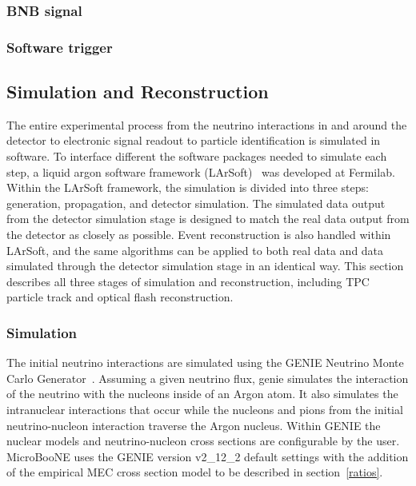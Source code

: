   \subsubsection{BNB signal}
  \subsubsection{Software trigger}

\subsection{Simulation and Reconstruction}\label{reco}
  The entire experimental process from the neutrino interactions in and around
  the detector to electronic signal readout to particle identification is
  simulated in software. To interface different the software packages needed to
  simulate each step, a liquid argon software framework (LArSoft)~\cite{larsoft}
  was developed at Fermilab. Within the LArSoft framework, the simulation is
  divided into three steps: generation, propagation, and detector simulation.
  The simulated data output from the detector simulation stage is designed to
  match the real data output from the detector as closely as possible. Event
  reconstruction is also handled within LArSoft, and the same algorithms can be
  applied to both real data and data simulated through the detector simulation
  stage in an identical way. This section describes all three stages of
  simulation and reconstruction, including TPC particle track and optical flash
  reconstruction.
  \subsubsection{Simulation}
    The initial neutrino interactions are simulated using the GENIE Neutrino
    Monte Carlo Generator~\cite{Andreopoulos:2009rq,Andreopoulos:2015wxa}.
    Assuming a given neutrino flux, genie simulates the interaction of the
    neutrino with the nucleons inside of an Argon atom. It also simulates the
    intranuclear interactions that occur while the nucleons and pions from the
    initial neutrino-nucleon interaction traverse the Argon nucleus.  Within
    GENIE the nuclear models and neutrino-nucleon cross sections are
    configurable by the user.  MicroBooNE uses the GENIE version v2\_12\_2
    default settings with the addition of the empirical MEC cross section model
    to be described in section~\ref{ratios}.

